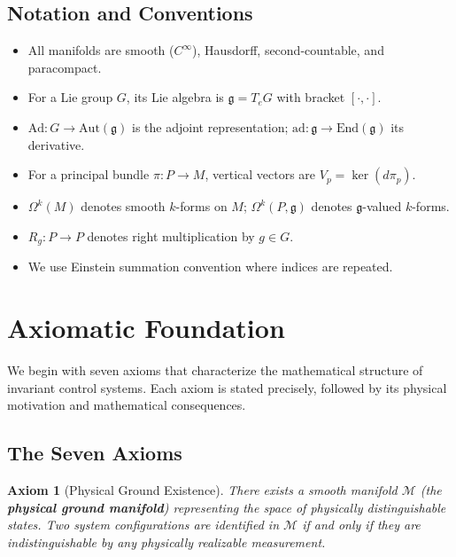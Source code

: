 \documentclass[11pt]{article}
\newtheorem{axiom}{Axiom}
\begin{document}
\subsection{Notation and Conventions}

\begin{itemize}
    \item All manifolds are smooth ($C^\infty$), Hausdorff, second-countable, and paracompact.
    \item For a Lie group $G$, its Lie algebra is $\mathfrak{g} = T_e G$ with bracket $[\cdot, \cdot]$.
    \item $\mathrm{Ad} : G \to \mathrm{Aut}(\mathfrak{g})$ is the adjoint representation; $\mathrm{ad} : \mathfrak{g} \to \mathrm{End}(\mathfrak{g})$ its derivative.
    \item For a principal bundle $\pi : P \to M$, vertical vectors are $V_p = \ker(d\pi_p)$.
    \item $\Omega^k(M)$ denotes smooth $k$-forms on $M$; $\Omega^k(P, \mathfrak{g})$ denotes $\mathfrak{g}$-valued $k$-forms.
    \item $R_g : P \to P$ denotes right multiplication by $g \in G$.
    \item We use Einstein summation convention where indices are repeated.
\end{itemize}

\section{Axiomatic Foundation}

We begin with seven axioms that characterize the mathematical structure of invariant control
systems. Each axiom is stated precisely, followed by its physical motivation and mathematical
consequences.

\subsection{The Seven Axioms}

\begin{axiom}[Physical Ground Existence]
There exists a smooth manifold $\mathcal{M}$ (the \textbf{physical
ground manifold}) representing the space of physically distinguishable states. Two system
configurations are identified in $\mathcal{M}$ if and only if they are indistinguishable by any physically
realizable measurement.
\end{axiom}
\end{document}
